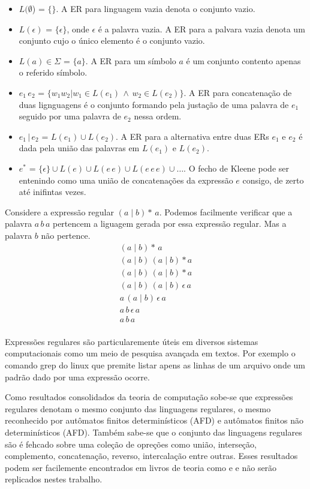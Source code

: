  \begin{itemize}
   \item $L(\emptyset$) = $\{\}$. A ER para linguagem vazia denota o conjunto vazio.
   \item $L(\epsilon)$ = $\{\epsilon\}$, onde $\epsilon$ é a palavra vazia. A ER para a palvara vazia denota um conjunto
         cujo o único elemento é o conjunto vazio.
   \item $L(a) \in \Sigma$ = $\{a\}$. A ER para um símbolo $a$ é um conjunto contento apenas o referido símbolo.
   \item $e_1\,e_2$ = $\{w_1w_2 | w_1 \in L(e_1) \,\wedge \, w_2 \in L(e_2) \}$. A ER para concatenação de duas lignguagens
         é o conjunto formando pela justação de uma palavra de $e_1$ seguido por uma palavra de $e_2$ nessa ordem.
   \item $e_1\,|\,e_2$ = $L(e_1) \cup L(e_2)$. A ER para a alternativa entre duas ERs $e_1$ e $e_2$ é dada pela união das
   palavras em $L(e_1)$ e $L(e_2)$.
   \item $e^*$ = $\{\epsilon\} \cup L(e) \cup L(e\,e) \cup L(e\,e\,e) \cup \ldots$. O fecho de Kleene pode ser entenindo como uma união de
   concatenações da expressão $e$ consigo, de zerto até inifintas vezes.
 \end{itemize}

  Considere a expressão regular $(a\;|\;b)*\,a$. Podemos facilmente verificar que a palavra $a\,b\,a$ pertencem a liguagem gerada por essa
  expressão regular. Mas a palavra $b$ não pertence.
  \[
   \begin{array}{l}
       (a\;|\;b)*\,a \\
       (a\;|\;b)\,(a\;|\;b)*a\\
       (a\;|\;b)\,(a\;|\;b)*a\\
       (a\;|\;b)\,(a\;|\;b)\,\epsilon\, a\\
       a\,(a\;|\;b)\,\epsilon\, a\\
       a\,b\,\epsilon\, a\\
       a\,b\,a\\
   \end{array}
  \]

  Expressões regulares são particularemente úteis em diversos sistemas computacionais como um meio de pesquisa avançada em textos. Por exemplo
  o comando grep\cite{linux_grep_man} do linux que premite listar apens as linhas de um arquivo onde um padrão dado por uma expressão ocorre.

  Como resultados consolidados da teoria de computação sobe-se que expressões regulares denotam o mesmo conjunto das linguagens regulares, o mesmo
  reconhecido por autômatos finitos determinísticos (AFD) e autômatos finitos não determinísticos (AFD). Também sabe-se que o conjunto das linguagens
  regulares são é fehcado sobre uma coleção de opreções como união, interseção, complemento, concatenação, reverso, intercalação entre outras.
  Esses resultados podem ser facilemente encontrados em livros de teoria como \cite{vieira2006} e \cite{hopcroft2006} e não serão replicados nestes
  trabalho.




